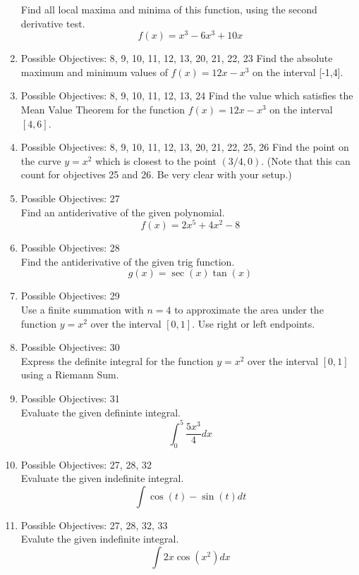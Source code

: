\documentclass{exam}
\begin{document}
\begin{enumerate}
Find all local maxima and minima of this function, using the second derivative test.
$$f(x) = x^3 - 6x^3 + 10x$$
\item Possible Objectives: 8, 9, 10, 11, 12, 13, 20, 21, 22, 23
Find the absolute maximum and minimum values of $f(x) = 12x - x^3$ on the interval [-1,4].
\item Possible Objectives: 8, 9, 10, 11, 12, 13, 24
Find the value which satisfies the Mean Value Theorem for the function $f(x) = 12x - x^3$ on the interval $[4,6]$.
\item Possible Objectives: 8, 9, 10, 11, 12, 13, 20, 21, 22, 25, 26
Find the point on the curve $y = x^2$ which is closest to the point $(3/4,0)$. (Note that this can count for objectives 25 and 26. Be very clear with your setup.)
\item Possible Objectives: 27\\
Find an antiderivative of the given polynomial.
$$f(x) = 2x^5 + 4x^2 -8$$
\item Possible Objectives: 28\\
Find the antiderivative of the given trig function.
$$g(x) = \sec(x)\tan(x)$$
\item Possible Objectives: 29\\
Use a finite summation with $n=4$ to approximate the area under the function $y = x^2$ over the interval $[0,1]$. Use right or left endpoints.
\item Possible Objectives: 30\\
Express the definite integral for the function $y = x^2$ over the interval $[0,1]$ using a Riemann Sum.
\item Possible Objectives: 31\\
Evaluate the given defininte integral.
$$\int_0^5 \frac{5x^3}{4} dx$$
\item Possible Objectives: 27, 28, 32\\
Evaluate the given indefinite integral.
$$\int \cos(t) - \sin(t) dt$$
\item Possible Objectives: 27, 28, 32, 33\\
Evalute the given indefinite integral.
$$\int 2x \cos(x^2) dx$$
\end{enumerate}
\end{document}
